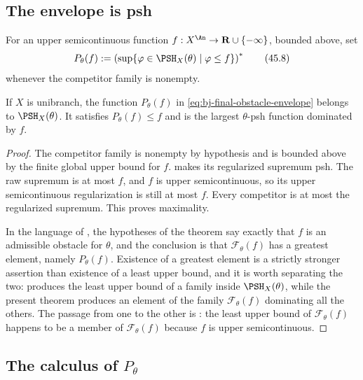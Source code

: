 \subsection{The envelope is psh}
\label{sec:ch45-obstacle-psh}

\begin{definition}
\label{def:bj-final-obstacle-envelope}
For an upper semicontinuous function
$f:X^{\An}\to\mathbf R\cup\{-\infty\}$, bounded above, set
\[
 P_\theta(f):=
 \left(
   \sup\{\varphi\in\PSH_X(\theta)\mid \varphi\le f\}
 \right)^*
\tag{45.8}\label{eq:bj-final-obstacle-envelope}
\]
whenever the competitor family is nonempty.
\end{definition}

\begin{theorem}\label{thm:bj-final-obstacle-psh}
If $X$ is unibranch, the function $P_\theta(f)$ in
\eqref{eq:bj-final-obstacle-envelope} belongs to $\PSH_X(\theta)$.
It satisfies $P_\theta(f)\le f$ and is the largest
$\theta$-psh function dominated by $f$.
\end{theorem}

\begin{proof}
The competitor family is nonempty by hypothesis and is bounded above by the
finite global upper bound for $f$.
 makes its regularized supremum psh.
The raw supremum is at most $f$, and $f$ is upper semicontinuous, so its
upper semicontinuous regularization is still at most $f$.
Every competitor is at most the regularized supremum.
This proves maximality.

In the language of , the hypotheses of
the theorem say exactly that $f$ is an admissible obstacle for $\theta$,
and the conclusion is that $\mathcal F_\theta(f)$ has a greatest element, namely
$P_\theta(f)$.  Existence of a greatest element is a strictly stronger
assertion than existence of a least upper bound, and it is worth separating
the two:  produces the least upper bound of a family
inside $\PSH_X(\theta)$, while the present theorem produces an element of
the family $\mathcal F_\theta(f)$ dominating all the others.  The passage from
one to the other is : the least upper
bound of $\mathcal F_\theta(f)$ happens to be a member of $\mathcal F_\theta(f)$
because $f$ is upper semicontinuous.
\end{proof}

\subsection{The calculus of \texorpdfstring{$P_\theta$}{P theta}}
\label{sec:ch45-obstacle-calculus}

